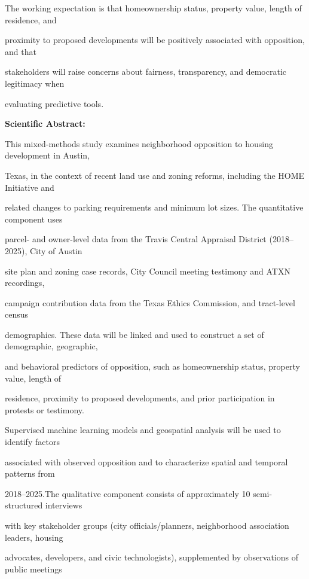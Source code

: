 \documentclass[10pt, letterpaper]{article}
\begin{document}
The working expectation is that homeownership status, property value, length of residence, and

proximity to proposed developments will be positively associated with opposition, and that

stakeholders will raise concerns about fairness, transparency, and democratic legitimacy when

evaluating predictive tools.

\vspace{0.5em}

\noindent \textbf{Scientific Abstract:}

\begin{responsebox}

This mixed-methods study examines neighborhood opposition to housing development in Austin,

\end{responsebox}

Texas, in the context of recent land use and zoning reforms, including the HOME Initiative and

related changes to parking requirements and minimum lot sizes. The quantitative component uses

parcel- and owner-level data from the Travis Central Appraisal District (2018–2025), City of Austin

site plan and zoning case records, City Council meeting testimony and ATXN recordings,

campaign contribution data from the Texas Ethics Commission, and tract-level census

demographics. These data will be linked and used to construct a set of demographic, geographic,

and behavioral predictors of opposition, such as homeownership status, property value, length of

residence, proximity to proposed developments, and prior participation in protests or testimony.

Supervised machine learning models and geospatial analysis will be used to identify factors

associated with observed opposition and to characterize spatial and temporal patterns from

2018–2025.The qualitative component consists of approximately 10 semi-structured interviews

with key stakeholder groups (city officials/planners, neighborhood association leaders, housing

advocates, developers, and civic technologists), supplemented by observations of public meetings
\end{document}
